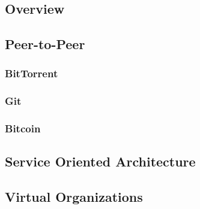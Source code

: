 \subsection{Overview}
\subsection{Peer-to-Peer}
\subsubsection{BitTorrent}
\subsubsection{Git}
\subsubsection{Bitcoin}
\subsection{Service Oriented Architecture}
\subsection{Virtual Organizations}